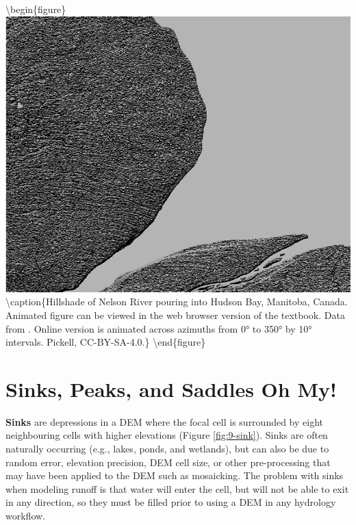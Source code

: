 \documentclass[
]{book}
\begin{document}
\textbackslash begin\{figure\}
\includegraphics[width=0.75\linewidth]{images/09-nelson-river-hillshade-animation} \textbackslash caption\{Hillshade of Nelson River pouring into Hudson Bay, Manitoba, Canada. Animated figure can be viewed in the web browser version of the textbook. Data from \citet{earth_resources_observation_and_science_center_usgs_2018}. Online version is animated across azimuths from 0° to 350° by 10° intervals. Pickell, CC-BY-SA-4.0.\}\label{fig:9-nelson-river-hillshade-animation}
\textbackslash end\{figure\}

\hypertarget{sinks-peaks-and-saddles-oh-my}{%
\section{Sinks, Peaks, and Saddles Oh My!}\label{sinks-peaks-and-saddles-oh-my}}

\textbf{Sinks} are depressions in a DEM where the focal cell is surrounded by eight neighbouring cells with higher elevations (Figure \ref{fig:9-sink}). Sinks are often naturally occurring (e.g., lakes, ponds, and wetlands), but can also be due to random error, elevation precision, DEM cell size, or other pre-processing that may have been applied to the DEM such as mosaicking. The problem with sinks when modeling runoff is that water will enter the cell, but will not be able to exit in any direction, so they must be filled prior to using a DEM in any hydrology workflow.
\end{document}
